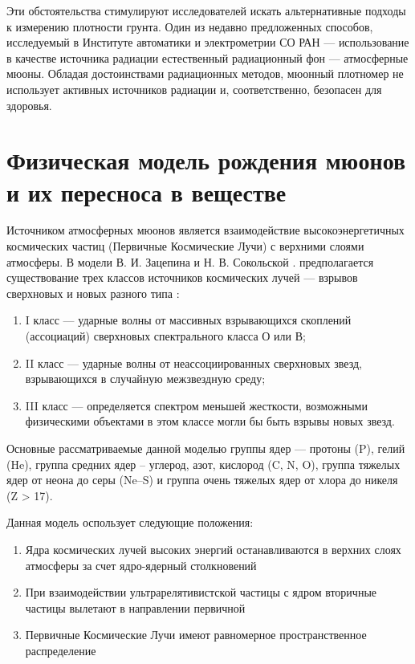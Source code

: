 Эти обстоятельства стимулируют исследователей искать альтернативные подходы к измерению плотности грунта. 
Один из недавно предложенных способов, исследуемый в Институте автоматики и электрометрии СО РАН \cite{patentdensitometer} ---
использование в качестве источника радиации естественный радиационный фон --- атмосферные мюоны. 
Обладая достоинствами радиационных методов, мюонный плотномер 
не использует активных источников радиации и, соответственно, безопасен для здоровья. 

\section{Физическая модель рождения мюонов и их пересноса в веществе}\label{sect1_2}

Источником атмосферных мюонов является взаимодействие высокоэнергетичных космических частиц (Первичные Космические Лучи) с верхними слоями атмосферы. В модели В. И. Зацепина и Н. В. Сокольской \cite{zacepin, sokolsky}. предполагается существование трех классов источников космических лучей --- взрывов сверхновых и новых разного типа :
\begin{enumerate}
	\item I класс --- ударные волны от массивных взрывающихся скоплений (ассоциаций) сверхновых спектрального класса О или В;
	\item II класс --- ударные волны от неассоциированных сверхновых звезд, взрывающихся в случайную межзвездную среду;
	\item III класс --- определяется спектром меньшей жесткости, возможными физическими объектами в этом классе могли бы быть взрывы новых звезд.
\end{enumerate}

Основные рассматриваемые данной моделью группы ядер --- протоны (P), гелий (He), группа  средних ядер -- углерод, азот, кислород (C, N, O), группа тяжелых ядер от неона до серы (Ne--S) и группа очень тяжелых ядер от хлора до никеля (Z > 17). 

Данная модель оспользует следующие положения:

\begin{enumerate}
	\item Ядра космических лучей высоких энергий останавливаются в верхних слоях атмосферы за счет ядро-ядерный столкновений
	\item При взаимодействии ультрарелятивистской частицы с ядром вторичные частицы вылетают в направлении первичной
	\item Первичные Космические Лучи имеют равномерное пространственное распределение
\end{enumerate}

